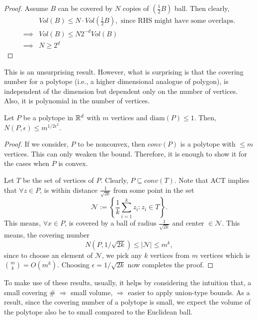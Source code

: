 \documentclass[12pt]{article}
\begin{document}
\begin{proof}
    Assume $B$ can be covered by $N$ copies of $(\frac{1}{2}B)$ ball. Then clearly,
    \begin{align*}
                 & Vol(B) \leq N \cdot Vol\left(\frac{1}{2}B\right), \text{ since RHS might have some overlaps.} \\
        \implies & Vol(B) \leq N 2^{-d} Vol(B)                                                                   \\
        \implies & N \geq 2^d
    \end{align*}
\end{proof}

This is an unsurprising result. However, what is surprising is that the covering number for a polytope (i.e., a higher dimensional analogue of polygon), is independent of the dimension but dependent only on the number of vertices. Also, it is polynomial in the number of vertices.

\begin{lemmabox}
    Let $P$ be a polytope in $\mathbb{R}^d$ with $m$ vertices and $\text{diam}(P) \leq 1$. Then, $N(P, \epsilon) \leq m^{1/2\epsilon^2}$.
\end{lemmabox}
\begin{proof}
    If we consider, $P$ to be nonconvex, then $conv(P)$ is a polytope with $\leq m$ vertices. This can only weaken the bound. Therefore, it is enough to show it for the cases when $P$ is convex.

    Let $T$ be the set of vertices of $P$. Clearly, $P \subseteq conv(T)$. Note that ACT implies that $\forall z \in P$, is within distance $\frac{1}{\sqrt{2k}}$ from some point in the set
    \begin{equation*}
        \mathcal{N} := \left\{\frac{1}{k} \sum_{i=1}^k z_i : z_i \in T \right\}.
    \end{equation*}
    \noindent This means, $\forall x \in P$, is covered by a ball of radius $\frac{1}{\sqrt{2k}}$ and center $\in \mathcal{N}$. This means, the covering number
    \begin{equation*}
        N(P, 1/\sqrt{2k}) \leq \vert \mathcal{N}\vert \leq m^k,
    \end{equation*}
    \noindent since to choose an element of $\mathcal{N}$, we pick any $k$ vertices from $m$ vertices which is $\binom{m}{k} = O(m^k)$. Choosing $\epsilon = 1/\sqrt{2k}$ now completes the proof.
\end{proof}

To make use of these results, usually, it helps by considering the intuition that, a small covering \# $\Rightarrow$ small volume, $\Rightarrow$ easier to apply union-type bounds. As a result, since the covering number of a polytope is small, we expect the volume of the polytope also be to small compared to the Euclidean ball.
\end{document}
